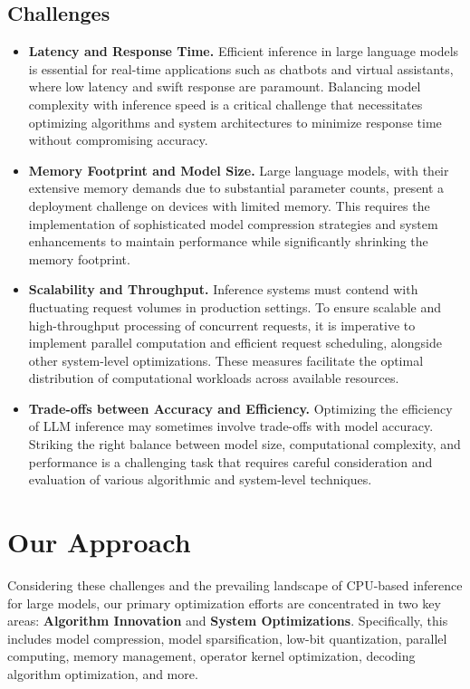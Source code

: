 \documentclass[conference]{IEEEtran}
\begin{document}
\subsection{Challenges}
\begin{itemize}
\item \textbf{Latency and Response Time.} Efficient inference in large language models is essential for real-time applications such as chatbots and virtual assistants, where low latency and swift response are paramount. Balancing model complexity with inference speed is a critical challenge that necessitates optimizing algorithms and system architectures to minimize response time without compromising accuracy.
\item \textbf{Memory Footprint and Model Size.} 
Large language models, with their extensive memory demands due to substantial parameter counts, present a deployment challenge on devices with limited memory. This requires the implementation of sophisticated model compression strategies and system enhancements to maintain performance while significantly shrinking the memory footprint.
\item \textbf{Scalability and Throughput.} Inference systems must contend with fluctuating request volumes in production settings. To ensure scalable and high-throughput processing of concurrent requests, it is imperative to implement parallel computation and efficient request scheduling, alongside other system-level optimizations. These measures facilitate the optimal distribution of computational workloads across available resources.
\item \textbf{Trade-offs between Accuracy and Efficiency.} Optimizing the efficiency of LLM inference may sometimes involve trade-offs with model accuracy. Striking the right balance between model size, computational complexity, and performance is a challenging task that requires careful consideration and evaluation of various algorithmic and system-level techniques.
\end{itemize}


\section{Our Approach}

Considering these challenges and the prevailing landscape of CPU-based inference for large models, our primary optimization efforts are concentrated in two key areas: \textbf{Algorithm Innovation} and \textbf{System Optimizations}. Specifically, this includes model compression, model sparsification, low-bit quantization, parallel computing, memory management, operator kernel optimization, decoding algorithm optimization, and more.
\end{document}

